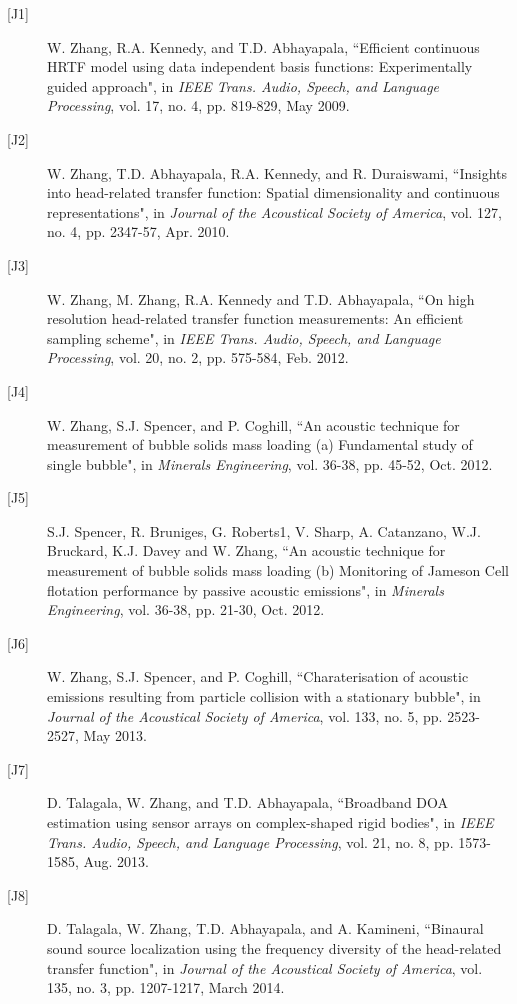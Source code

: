 \documentclass[11pt]{article}
\begin{document}
\begin{description}

\item[{[}J1{]}]W. Zhang, R.A. Kennedy, and T.D. Abhayapala,
``Efficient continuous HRTF model using data independent basis functions: Experimentally guided approach", in {\em
IEEE Trans. Audio, Speech, and Language Processing}, vol. 17, no. 4, pp. 819-829, May 2009.

\item[{[}J2{]}]W. Zhang, T.D. Abhayapala, R.A. Kennedy, and R. Duraiswami,
``Insights into head-related transfer function: Spatial dimensionality and continuous representations",
in \emph{Journal of the Acoustical Society of America}, vol. 127, no. 4, pp. 2347-57, Apr. 2010.

\item[{[}J3{]}]W. Zhang, M. Zhang, R.A. Kennedy and T.D. Abhayapala, ``On high resolution head-related transfer function measurements: An efficient sampling scheme", in \emph{IEEE Trans. Audio, Speech, and Language Processing}, vol. 20, no. 2, pp. 575-584, Feb. 2012.

\item[{[}J4{]}]W. Zhang, S.J. Spencer, and P. Coghill,
``An acoustic technique for measurement of bubble solids mass loading (a) Fundamental study of single bubble", in {\em Minerals Engineering}, vol. 36-38, pp. 45-52, Oct. 2012.

\item[{[}J5{]}]S.J. Spencer, R. Bruniges, G. Roberts1, V. Sharp, A. Catanzano, W.J. Bruckard, K.J. Davey and W. Zhang,
``An acoustic technique for measurement of bubble solids mass loading (b) Monitoring of Jameson Cell flotation performance by passive acoustic emissions", in {\em Minerals Engineering}, vol. 36-38, pp. 21-30, Oct. 2012.

\item[{[}J6{]}]W. Zhang, S.J. Spencer, and P. Coghill,
``Charaterisation of acoustic emissions resulting from particle collision with a stationary bubble", in {\em Journal of the Acoustical Society of America}, vol. 133, no. 5, pp. 2523-2527, May 2013.

\item[{[}J7{]}]D. Talagala, W. Zhang, and T.D. Abhayapala, ``Broadband DOA estimation using sensor arrays on complex-shaped rigid bodies", in {\em IEEE Trans. Audio, Speech, and Language Processing}, vol. 21, no. 8, pp. 1573-1585, Aug. 2013.

\item[{[}J8{]}]D. Talagala, W. Zhang, T.D. Abhayapala, and A. Kamineni, ``Binaural sound source localization using the frequency diversity of the head-related transfer function", in {\em Journal of the Acoustical Society of America}, vol. 135, no. 3, pp. 1207-1217, March 2014.


\end{description}
\end{document}
